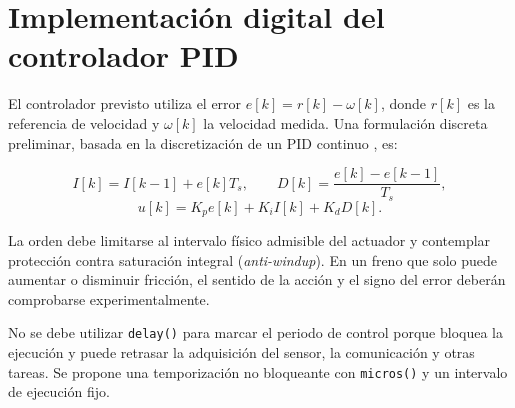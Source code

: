 \documentclass[9pt,a4paper,twocolumn]{extarticle}
\newcommand{\passthrough}[1]{#1}
\begin{document}
\section{Implementación digital del controlador
PID}\label{implementaciuxf3n-digital-del-controlador-pid}

El controlador previsto utiliza el error \(e[k]=r[k]-\omega[k]\), donde
\(r[k]\) es la referencia de velocidad y \(\omega[k]\) la velocidad
medida. Una formulación discreta preliminar, basada en la discretización de un PID continuo \cite{ogata2010}, es:

\[
I[k]=I[k-1]+e[k]T_s,\qquad
D[k]=\frac{e[k]-e[k-1]}{T_s},
\]
\[
 u[k]=K_p e[k]+K_i I[k]+K_d D[k].
\]

La orden debe limitarse al intervalo físico admisible del actuador y
contemplar protección contra saturación integral (\emph{anti-windup}).
En un freno que solo puede aumentar o disminuir fricción, el sentido de
la acción y el signo del error deberán comprobarse experimentalmente.

No se debe utilizar \passthrough{\lstinline!delay()!} para marcar el
periodo de control porque bloquea la ejecución y puede retrasar la
adquisición del sensor, la comunicación y otras tareas. Se propone una
temporización no bloqueante con \passthrough{\lstinline!micros()!} \cite{arduinoMicros} y un
intervalo de ejecución fijo.
\end{document}
